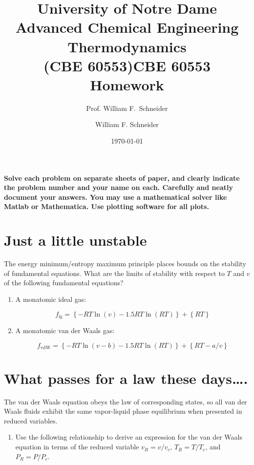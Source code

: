 \documentclass[11pt]{article}
\title{University of Notre Dame\\Advanced Chemical Engineering Thermodynamics\\(CBE 60553)}
\author{Prof. William F.\ Schneider}
\author{William F. Schneider}
\date{\today}
\title{CBE 60553 Homework}
\begin{document}
\begin{OPTIONS}
\end{OPTIONS}

\noindent \textbf{Solve each problem on separate sheets of paper, and clearly indicate the problem number and your name on each.  Carefully and neatly document your answers.  You may use a mathematical solver like Matlab or Mathematica. Use plotting software for all plots.}

\section{Just a little unstable}
\label{sec:orgbfe460c}
The energy minimum/entropy maximum principle places bounds on the stability of fundamental equations.  What are the limits of stability with respect to \(T\) and \(v\) of the following fundamental equations?

\begin{enumerate}
\item A monatomic ideal gas:

\begin{equation*}
 f_\text{ig} = \left \{ - RT \ln (v) -1.5 R T \ln (R T) \right\} +\left \{ RT \right \}
\end{equation*}

\item A monatomic van der Waals gas:

\begin{equation*}
  f_\text{vdW} = \left \{ - RT \ln (v-b) -1.5 R T \ln (R T) \right\} +\left \{ RT -a/v
  \right \}
  \end{equation*}
\end{enumerate}

\section{What passes for a law these days\ldots{}.}
\label{sec:orga7cee78}
The van der Waals equation obeys
  the law of corresponding states, so all van der Waals fluids exhibit the same
  vapor-liquid phase equilibrium when presented in reduced variables.

\begin{enumerate}
\item Use the following relationship to derive an expression for the van der Waals
equation in terms of the reduced variable \(v_R = v/v_c\), \(T_R = T/T_c\), and
\(P_R = P/P_c\).
\end{enumerate}
\end{document}
